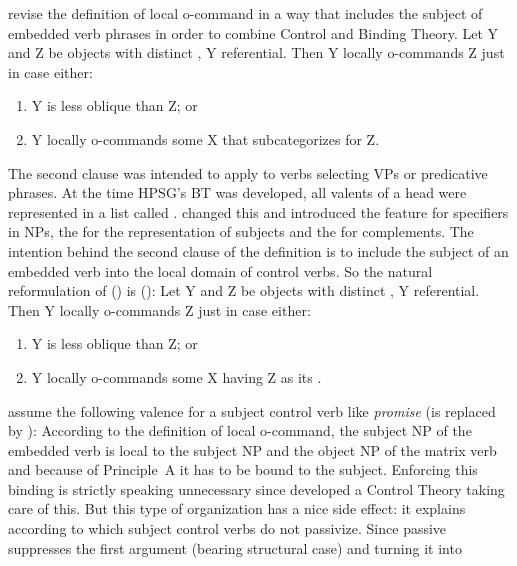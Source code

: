 \documentclass[output=paper
	        ,collection
	        ,collectionchapter
 	        ,biblatex
                ,babelshorthands
                ,newtxmath
                ,draftmode
                ,colorlinks, citecolor=brown
]{langscibook}
\begin{document}
\citet[Section~6.8.3]{ps2} revise the definition of local o-command in a way that
includes the subject of embedded verb phrases in order to combine Control and Binding
Theory.
\ea
Let Y and Z be  objects with distinct \localvs, Y referential. Then Y locally
o-commands Z just in case either:
\begin{enumerate}[label=\roman*.]
\item Y is less oblique than Z; or
\item Y locally o-commands some X that subcategorizes for Z.
\end{enumerate}
\z
The second clause was intended to apply to verbs selecting VPs or predicative phrases. At the time
HPSG's BT was developed, all valents of a head were represented in a list called
\subcatl. \citet[Chapter~9]{ps2} changed this and introduced the \spr feature for specifiers in NPs,
the \subjf for the representation of subjects and the \compsf for complements. The intention behind
the second clause of the definition is to include the subject of an embedded verb into the local
domain of control verbs. So the natural reformulation of () is ():
\ea
\label{def-local-o-command}
Let Y and Z be  objects with distinct \localvs, Y referential. Then Y locally
o-commands Z just in case either:
\begin{enumerate}[label=\roman*.]
\item Y is less oblique than Z; or
\item Y locally o-commands some X having Z as its \subjv.
\end{enumerate}
\z
\citet[]{ps2} assume the following valence for a subject control verb like \emph{promise}
(\subcat is replaced by \subj):
\ea
{}
\z
According to the definition of local o-command, the subject NP of the embedded verb is local to the
subject NP and the object NP of the matrix verb and because of Principle~A it has to be bound to the
subject. Enforcing this binding is strictly speaking unnecessary since \citet[Chapter~7]{ps2} developed a
Control Theory taking care of this. But this type of organization has a nice side effect: it
explains  according to which subject control verbs do not
passivize. Since passive suppresses the first argument (bearing structural case) and turning it into
\end{document}

